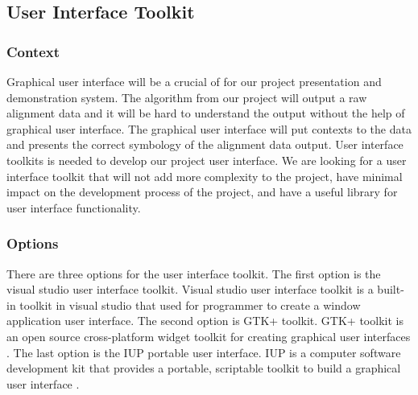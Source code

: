 


\subsection{User Interface Toolkit}
\subsubsection{Context}
Graphical user interface will be a crucial of for our project presentation and demonstration system.
The algorithm from our project will output a raw alignment data and it will be hard to understand the output without the help of graphical user interface.
The graphical user interface will put contexts to the data and presents the correct symbology of the alignment data output.
User interface toolkits is needed to develop our project user interface.
We are looking for a user interface toolkit that will not add more complexity to the project, have minimal impact on the development process of the project, and have a useful library for user interface functionality. \\

\subsubsection{Options}
There are three options for the user interface toolkit.
The first option is the visual studio user interface toolkit.
Visual studio user interface toolkit is a built-in toolkit in visual studio that used for programmer to create a window application user interface.
The second option is GTK+ toolkit.
GTK+ toolkit is an open source cross-platform widget toolkit for creating graphical user interfaces \cite{gtk}.
The last option is the IUP portable user interface.
IUP is a computer software development kit that provides a portable, scriptable toolkit to build a graphical user interface \cite{iup}. \\


